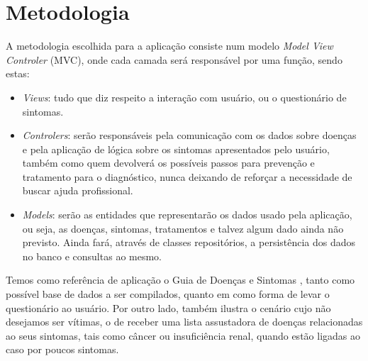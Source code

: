 \section{Metodologia}

A metodologia escolhida para a aplicação consiste num modelo \emph{Model View Controler} (MVC), onde cada camada será responsável por uma função, sendo estas:
\begin{itemize}
    \item \emph{Views}: tudo que diz respeito a interação com usuário, ou o questionário de sintomas.
    \item \emph{Controlers}: serão responsáveis pela comunicação com os dados sobre doenças e pela aplicação de lógica sobre os sintomas apresentados pelo usuário, também como quem devolverá os possíveis passos para prevenção e tratamento para o diagnóstico, nunca deixando de reforçar a necessidade de buscar ajuda profissional.
    \item \emph{Models}: serão as entidades que representarão os dados usado pela aplicação, ou seja, as doenças, sintomas, tratamentos e talvez algum dado ainda não previsto. Ainda fará, através de classes repositórios, a persistência dos dados no banco e consultas ao mesmo.
\end{itemize}


Temos como referência de aplicação o Guia de Doenças e Sintomas \cite{alberteinstein}, tanto como possível base de dados a ser compilados, quanto em como forma de levar o questionário ao usuário.
Por outro lado, também ilustra o cenário cujo não desejamos ser vítimas, o de receber uma lista assustadora de doenças relacionadas ao seus sintomas, tais como câncer ou insuficiência renal, quando estão ligadas ao caso por poucos sintomas.


